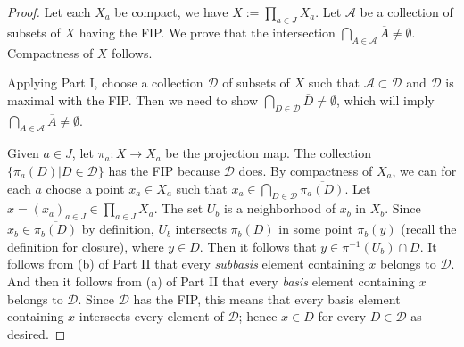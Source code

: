 \documentclass[article,11pt, reqno]{article}
\theoremstyle{remark}
\newcommand{\inv}{^{-1}}
\newcommand{\mc}{\mathcal}
\newcommand{\ra}{\rightarrow}
\newcommand{\<}{\langle}
\renewcommand{\>}{\rangle}
\begin{document}
\begin{proof}
    Let each $X_a$ be compact, we have $X:=\prod_{a\in J}X_a$. Let $\mc A$ be a collection of subsets of $X$ having the FIP. We prove that the intersection $\bigcap_{A\in\mc A}\overline A\neq \emptyset$. Compactness of $X$ follows.

    Applying Part I, choose a collection $\mc D$ of subsets of $X$ such that $\mc A\subset\mc D$ and $\mc D$ is maximal with the FIP. Then we need to show $\bigcap_{D\in\mc D}\overline D\neq\emptyset$, which will imply $\bigcap_{A\in\mc A}\overline A\neq \emptyset$.

    Given $a\in J$, let $\pi_a: X\ra X_a$ be the projection map. The collection $\{\pi_a(D)|D\in\mc D\}$ has the FIP because $\mc D$ does. By compactness of $X_a$, we can for each $a$ choose a point $x_a\in X_a$ such that $x_a\in\bigcap_{D\in\mc D}\overline{\pi_a(D)}$. Let $x=(x_a)_{a\in J}\in\prod_{a\in J} X_a$. The set $U_b$ is a neighborhood of $x_b$ in $X_b$. Since $x_b\in \overline{\pi_b(D)}$ by definition, $U_b$ intersects $\pi_b(D)$ in some point $\pi_b(y)$ (recall the definition for closure), where $y\in D$. Then it follows that $y \in\pi\inv(U_b)\cap D$. It follows from (b) of Part II that every \textit{subbasis} element containing $x$ belongs to $\mc D$. And then it follows from (a) of Part II that every \textit{basis} element containing $x$ belongs to $\mc D$. Since $\mc D$ has the FIP, this means that every basis element containing $x$ intersects every element of $\mc D$; hence $x\in \overline{D}$ for every $D\in\mc D$ as desired.
\end{proof}
\end{document}
